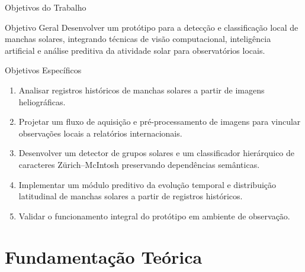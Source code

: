 \documentclass[aspectratio=169]{beamer}
\makeatletter
\newcounter{prismfigure}
\renewcommand{\theprismfigure}{\arabic{prismfigure}}
\let\prism@original@includegraphics\includegraphics
\renewcommand{\includegraphics}[2][]{%
    \prism@original@includegraphics[#1]{#2}%
    \refstepcounter{prismfigure}%
    \label{fig:auto-\theprismfigure}%
}
\makeatother
\begin{document}
\begin{frame}{Objetivos do Trabalho}
    \begin{block}{Objetivo Geral}
        \scriptsize
        Desenvolver um protótipo para a detecção e classificação local de manchas solares, integrando técnicas de visão computacional, inteligência artificial e análise preditiva da atividade solar para observatórios locais.
    \end{block}

    \vspace{0.1cm}
    \begin{block}{Objetivos Específicos}
        \scriptsize
        \begin{enumerate}
            \item Analisar registros históricos de manchas solares a partir de imagens heliográficas.
            \item Projetar um fluxo de aquisição e pré-processamento de imagens para vincular observações locais a relatórios internacionais.
            \item Desenvolver um detector de grupos solares e um classificador hierárquico de caracteres Zürich--McIntosh preservando dependências semânticas.
            \item Implementar um módulo preditivo da evolução temporal e distribuição latitudinal de manchas solares a partir de registros históricos.
            \item Validar o funcionamento integral do protótipo em ambiente de observação.
        \end{enumerate}
    \end{block}
\end{frame}

\section{Fundamentação Teórica}

    
    
\end{document}
